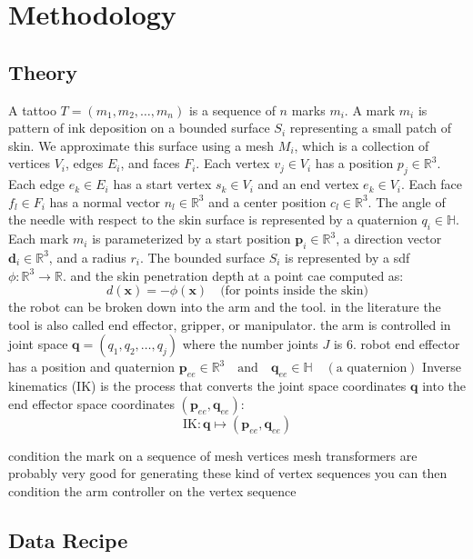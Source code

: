 \documentclass[11pt]{article}
\begin{document}
\section{Methodology}

\subsection{Theory}

A tattoo $T = (m_1, m_2, \ldots, m_n)$ is a sequence of $n$ marks $m_i$.
A mark $m_i$ is pattern of ink deposition on a bounded surface $S_i$ representing a small patch of skin.
We approximate this surface using a mesh $M_i$, which is a collection of vertices $V_i$, edges $E_i$, and faces $F_i$.
Each vertex $v_j \in V_i$ has a position $p_j \in \mathbb{R}^3$.
Each edge $e_k \in E_i$ has a start vertex $s_k \in V_i$ and an end vertex $e_k \in V_i$.
Each face $f_l \in F_i$ has a normal vector $n_l \in \mathbb{R}^3$ and a center position $c_l \in \mathbb{R}^3$.
The angle of the needle with respect to the skin surface is represented by a quaternion $q_i \in \mathbb{H}$.
Each mark $m_i$ is parameterized by a start position \( \mathbf{p}_i \in \mathbb{R}^3 \), a direction vector \( \mathbf{d}_i \in \mathbb{R}^3 \), and a radius \( r_i \).
The bounded surface $S_i$ is represented by a sdf $\phi: \mathbb{R}^3 \to \mathbb{R}$.
and the skin penetration depth at a point cae computed as:
\[
d(\mathbf{x}) = -\phi(\mathbf{x}) \quad \text{(for points inside the skin)}
\]
the robot can be broken down into the arm and the tool.
in the literature the tool is also called end effector, gripper, or manipulator.
the arm is controlled in joint space $\mathbf{q} = (q_1, q_2, \ldots, q_j)$ where the number joints $J$ is $6$.
robot end effector has a position and quaternion $\mathbf{p}_{ee} \in \mathbb{R}^3 \quad \text{and} \quad \mathbf{q}_{ee} \in \mathbb{H} \quad (\text{a quaternion})$
Inverse kinematics (IK) is the process that converts the joint space coordinates \( \mathbf{q} \) into the end effector space coordinates \( (\mathbf{p}_{ee}, \mathbf{q}_{ee}) \):
\[
\text{IK}: \mathbf{q} \mapsto (\mathbf{p}_{ee}, \mathbf{q}_{ee})
\]

condition the mark on a sequence of mesh vertices
mesh transformers are probably very good for generating these kind of vertex sequences
you can then condition the arm controller on the vertex sequence

\subsection{Data Recipe}
\end{document}
